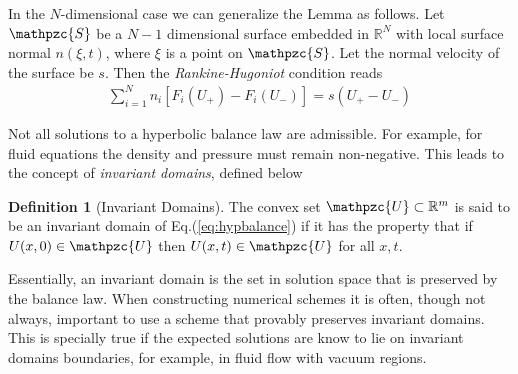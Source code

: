 \documentclass[11pt, reqno]{amsart}
\newcommand{\eqr}[1]{Eq.\thinspace(#1)}
\newcommand{\script}[1]{\mathpzc{#1}}
\theoremstyle{definition}
\newtheorem{dfn}{Definition}
\begin{document}
In the $N$-dimensional case we can generalize the Lemma as
follows. Let $\script{S}$ be a $N-1$ dimensional surface embedded in
$\mathbb{R}^N$ with local surface normal $n(\xi,t)$, where $\xi$ is a
point on $\script{S}$. Let the normal velocity of the surface be
$s$. Then the \emph{Rankine-Hugoniot} condition reads
\begin{align}
  \sum_{i=1}^N 
  n_i[F_i(U_+) - F_i(U_-)] = s(U_+ - U_-)
\end{align}

Not all solutions to a hyperbolic balance law are admissible. For
example, for fluid equations the density and pressure must remain
non-negative. This leads to the concept of \emph{invariant domains},
defined below
\begin{dfn}[Invariant Domains]
  The convex set $\script{U} \subset \mathbb{R}^m$ is said to be an
  invariant domain of \eqr{\ref{eq:hypbalance}} if it has the property
  that if $U(x,0) \in \script{U}$ then $U(x,t) \in \script{U}$ for all
  $x,t$.
\end{dfn}

Essentially, an invariant domain is the set in solution space that is
preserved by the balance law. When constructing numerical schemes it
is often, though not always, important to use a scheme that provably
preserves invariant domains. This is specially true if the expected
solutions are know to lie on invariant domains boundaries, for
example, in fluid flow with vacuum regions.
\end{document}
